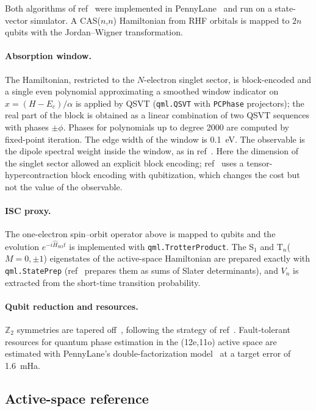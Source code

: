 \documentclass[journal=jpcafh,manuscript=article]{achemso}
\newcommand{\Hso}{\hat H_\mathrm{SO}}
\begin{document}
Both algorithms of ref~ were implemented in PennyLane~\cite{Bergholm2018} and run
on a state-vector simulator. A CAS($n$,$n$) Hamiltonian from RHF orbitals is mapped to $2n$ qubits
with the Jordan--Wigner transformation.

\paragraph{Absorption window.} The Hamiltonian, restricted to the $N$-electron singlet sector, is
block-encoded and a single even polynomial approximating a smoothed window indicator on
$x=(H-E_c)/\alpha$ is applied by QSVT (\texttt{qml.QSVT} with \texttt{PCPhase} projectors); the real
part of the block is obtained as a linear combination of two QSVT sequences with phases $\pm\phi$.
Phases for polynomials up to degree 2000 are computed by fixed-point iteration. The edge width of
the window is 0.1~eV. The observable is the dipole spectral weight inside the window, as in
ref~. Here the dimension of the singlet sector allowed an explicit block encoding;
ref~ uses a tensor-hypercontraction block encoding with qubitization, which
changes the cost but not the value of the observable.

\paragraph{ISC proxy.} The one-electron spin--orbit operator above is mapped to qubits and the
evolution $e^{-i\Hso t}$ is implemented with \texttt{qml.TrotterProduct}. The S$_1$ and
T$_n$($M=0,\pm1$) eigenstates of the active-space Hamiltonian are prepared exactly with
\texttt{qml.StatePrep} (ref~ prepares them as sums of Slater determinants), and
$V_n$ is extracted from the short-time transition probability.

\paragraph{Qubit reduction and resources.} $\mathbb{Z}_2$ symmetries are tapered
off~\cite{Bravyi2017}, following the strategy of ref~. Fault-tolerant resources
for quantum phase estimation in the (12e,11o) active space are estimated with PennyLane's
double-factorization model~\cite{vonBurg2021,Lee2021} at a target error of 1.6~mHa.

\subsection{Active-space reference}
\end{document}
